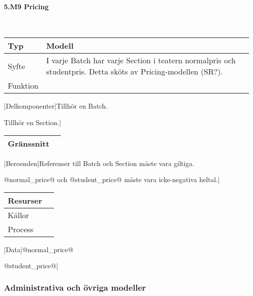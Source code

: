 \documentclass[a4paper, twoside, 11pt, titlepage]{article}
\begin{document}
			\paragraph{5.M9 Pricing}\

			\begin {table} [ht] \begin{tabular} {  p{3.5cm} p{9.6cm} }
				\hline
				Typ & Modell  \\
				\hline
				Syfte & I varje Batch har varje Section i teatern normalpris och studentpris. Detta sköts av Pricing-modellen (SR?).  \\
				\hline
				Funktion &   \\
				\hline
			\end{tabular} \end{table} \FloatBarrier
			\vspace{6mm}

			|Delkomponenter|Tillhör en Batch.

			Tillhör en Section.|

			\begin {table} [ht] \begin{tabular} {  p{3.5cm} p{9.6cm} }
				\hline
				Gränssnitt &   \\
				\hline
			\end{tabular} \end{table} \FloatBarrier
			\vspace{6mm}

			|Beroenden|Referenser till Batch och Section måste vara giltiga.

			@normal\_price@ och @student\_price@ måste vara icke-negativa heltal.|

			\begin {table} [ht] \begin{tabular} {  p{3.5cm} p{9.6cm} }
				\hline
				Resurser &   \\
				\hline
				Källor &   \\
				\hline
				Process &   \\
				\hline
			\end{tabular} \end{table} \FloatBarrier
			\vspace{6mm}

			|Data|@normal\_price@

			@student\_price@|

		\subsubsection{Administrativa och övriga modeller}
\end{document}
